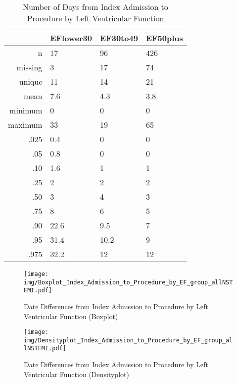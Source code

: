 \documentclass[a4paper]{report}
\begin{document}
\begin{itemize}
{%
\begin{table}[ht]
\centering
\begin{tabular}{rlll}
  \toprule
 & EFlower30 & EF30to49 & EF50plus \\ 
  \midrule
n & 17 & 96 & 426 \\ 
  missing & 3 & 17 & 74 \\ 
  unique & 11 & 14 & 21 \\ 
  mean & 7.6 & 4.3 & 3.8 \\ 
  minimum & 0 & 0 & 0 \\ 
  maximum & 33 & 19 & 65 \\ 
  .025 & 0.4 & 0 & 0 \\ 
  .05 & 0.8 & 0 & 0 \\ 
  .10 & 1.6 & 1 & 1 \\ 
  .25 & 2 & 2 & 2 \\ 
  .50 & 3 & 4 & 3 \\ 
  .75 & 8 & 6 & 5 \\ 
  .90 & 22.6 & 9.5 & 7 \\ 
  .95 & 31.4 & 10.2 & 9 \\ 
  .975 & 32.2 & 12 & 12 \\ 
   \bottomrule
\end{tabular}
\caption{Number of Days from Index Admission to Procedure by Left Ventricular Function} 
\end{table}
\begin{figure}
  \centering
  \caption{Date Differences from Index Admission to Procedure by Left Ventricular Function (Boxplot)}
  \label{Boxplot: Date Differences from Index Admission to Procedure by Left Ventricular Function}
\texttt{[image: img/Boxplot\_Index\_Admission\_to\_Procedure\_by\_EF\_group\_allNSTEMI.pdf]}\end{figure}


\begin{figure}
  \centering
  \caption{Date Differences from Index Admission to Procedure by Left Ventricular Function (Densityplot)}
  \label{Density: Date Differences from Index Admission to Procedure by Left Ventricular Function}
\texttt{[image: img/Densityplot\_Index\_Admission\_to\_Procedure\_by\_EF\_group\_allNSTEMI.pdf]}\end{figure}



\clearpage

}
\end{itemize}
\end{document}
